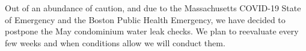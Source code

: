 \documentclass[letterpaper,10pt]{texMemo}
\begin{document}
\maketitle


Out of an abundance of caution, and due to the
Massachusetts COVID-19 State of Emergency
and the Boston Public Health Emergency, we have decided to postpone the May
condominium water leak
checks. We plan to reevaluate every few weeks and when conditions
allow we will conduct them.
\end{document}
